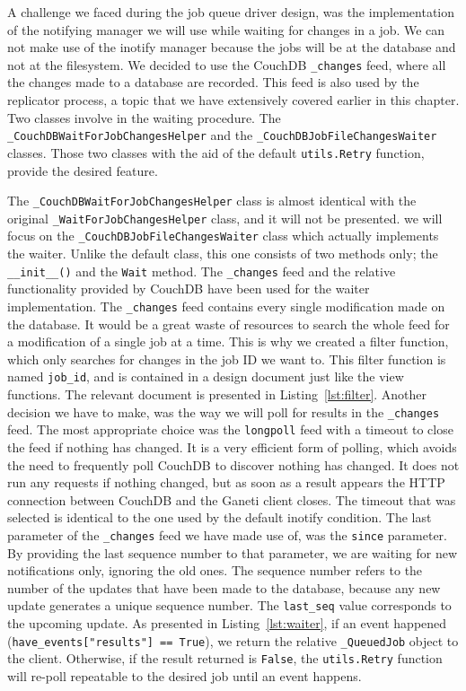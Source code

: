 \begin{description}
    A challenge we faced during the job queue driver design, was the
    implementation of the notifying manager we will use while waiting for
    changes in a job. We can not make use of the inotify manager because the
    jobs will be at the database and not at the filesystem. We decided to use
    the CouchDB \texttt{\_changes} feed, where all the changes made to a
    database are recorded. This feed is also used by the replicator process, a
    topic that we have extensively covered earlier in this chapter. Two classes
    involve in the waiting procedure. The
    \texttt{\_CouchDBWaitForJobChangesHelper} and the
    \texttt{\_CouchDBJobFileChangesWaiter} classes. Those two classes with the
    aid of the default \texttt{utils.Retry} function, provide the desired
    feature.

    The \texttt{\_CouchDBWaitForJobChangesHelper} class is almost identical with
    the original \texttt{\_WaitForJobChangesHelper} class, and it will not
    be presented. we will focus on the \texttt{\_CouchDBJobFileChangesWaiter}
    class which actually implements the waiter. Unlike the default class, this
    one consists of two methods only; the \texttt{\_\_init\_\_()} and
    the \texttt{Wait} method. The \texttt{\_changes} feed and the relative
    functionality provided by CouchDB have been used for the waiter
    implementation. The \texttt{\_changes} feed contains every single
    modification made on the database. It would be a great
    waste of resources to search the whole feed for a modification of a single
    job at a time. This is why we created a filter function, which only searches
    for changes in the job ID we want to. This filter function is named
    \texttt{job\_id}, and is contained in a design document just like the view
    functions. The relevant document is presented in Listing~\ref{lst:filter}.
    Another decision we have to make, was the way we will poll for results in
    the \texttt{\_changes} feed. The most appropriate choice was the
    \texttt{longpoll} feed with a timeout to close the feed if nothing has
    changed. It is a very efficient form of polling, which avoids the need to
    frequently poll CouchDB to discover nothing has changed. It does not run any
    requests if nothing changed, but as soon as a result appears the HTTP
    connection between CouchDB and the Ganeti client closes. The timeout that
    was selected is identical to the one used by the default inotify condition.
    The last parameter of the \texttt{\_changes} feed we have made use of, was
    the \texttt{since} parameter. By providing the last sequence number to that
    parameter, we are waiting for new notifications only, ignoring the old ones.
    The sequence number refers to the number of the updates that have been made
    to the database, because any new update generates a unique sequence number.
    The \texttt{last\_seq} value corresponds to the upcoming update. As
    presented in Listing~\ref{lst:waiter}, if an event happened
    (\texttt{have\_events["results"] == True}), we return the relative
    \texttt{\_QueuedJob} object to the client. Otherwise, if the result returned
    is \texttt{False}, the \texttt{utils.Retry} function will re-poll repeatable
    to the desired job until an event happens.


\end{description}
